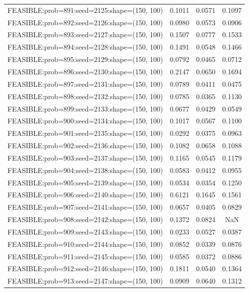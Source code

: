 \begin{longtable}{lccc}
FEASIBLE:prob=891:seed=2125:shape=(150, 100) & 0.1011 & 0.0571 & 0.1097 \\
FEASIBLE:prob=892:seed=2126:shape=(150, 100) & 0.0980 & 0.0573 & 0.0906 \\
FEASIBLE:prob=893:seed=2127:shape=(150, 100) & 0.1507 & 0.0777 & 0.1533 \\
FEASIBLE:prob=894:seed=2128:shape=(150, 100) & 0.1491 & 0.0548 & 0.1466 \\
FEASIBLE:prob=895:seed=2129:shape=(150, 100) & 0.0792 & 0.0465 & 0.0712 \\
FEASIBLE:prob=896:seed=2130:shape=(150, 100) & 0.2147 & 0.0650 & 0.1694 \\
FEASIBLE:prob=897:seed=2131:shape=(150, 100) & 0.0789 & 0.0411 & 0.0475 \\
FEASIBLE:prob=898:seed=2132:shape=(150, 100) & 0.0785 & 0.0365 & 0.1130 \\
FEASIBLE:prob=899:seed=2133:shape=(150, 100) & 0.0677 & 0.0429 & 0.0549 \\
FEASIBLE:prob=900:seed=2134:shape=(150, 100) & 0.1017 & 0.0567 & 0.1100 \\
FEASIBLE:prob=901:seed=2135:shape=(150, 100) & 0.0292 & 0.0375 & 0.0963 \\
FEASIBLE:prob=902:seed=2136:shape=(150, 100) & 0.1082 & 0.0658 & 0.1088 \\
FEASIBLE:prob=903:seed=2137:shape=(150, 100) & 0.1165 & 0.0545 & 0.1179 \\
FEASIBLE:prob=904:seed=2138:shape=(150, 100) & 0.0583 & 0.0412 & 0.0955 \\
FEASIBLE:prob=905:seed=2139:shape=(150, 100) & 0.0534 & 0.0354 & 0.1250 \\
FEASIBLE:prob=906:seed=2140:shape=(150, 100) & 0.6121 & 0.1645 & 0.1561 \\
FEASIBLE:prob=907:seed=2141:shape=(150, 100) & 0.0657 & 0.0405 & 0.0829 \\
FEASIBLE:prob=908:seed=2142:shape=(150, 100) & 0.1372 & 0.0824 &    NaN \\
FEASIBLE:prob=909:seed=2143:shape=(150, 100) & 0.0233 & 0.0527 & 0.0387 \\
FEASIBLE:prob=910:seed=2144:shape=(150, 100) & 0.0852 & 0.0339 & 0.0876 \\
FEASIBLE:prob=911:seed=2145:shape=(150, 100) & 0.0585 & 0.0372 & 0.0886 \\
FEASIBLE:prob=912:seed=2146:shape=(150, 100) & 0.1811 & 0.0540 & 0.1364 \\
FEASIBLE:prob=913:seed=2147:shape=(150, 100) & 0.0909 & 0.0640 & 0.1312 \\

\end{longtable}
